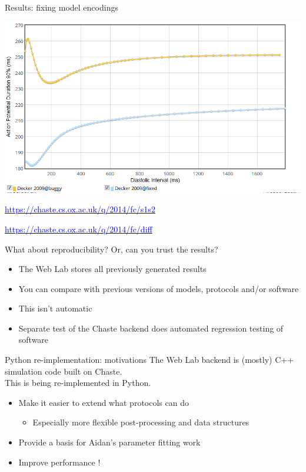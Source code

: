 \documentclass[t,xcolor={usenames,dvipsnames}]{beamer}
\newcommand{\myhref}[2]{\href{#1}{\textcolor{Blue}{#2}}}
\newcommand{\myurl}[1]{\myhref{#1}{#1}}
\newcommand{\subitem}[1]{\begin{itemize}[<.->]\item #1 \end{itemize}}
\begin{document}
\begin{frame}{Results: fixing model encodings}
\begin{center}
\includegraphics[width=\textwidth]{decker_comparison}

\tiny
\myurl{https://chaste.cs.ox.ac.uk/q/2014/fc/s1s2}

\myurl{https://chaste.cs.ox.ac.uk/q/2014/fc/diff}
\end{center}
\end{frame}


\begin{frame}{What about reproducibility?}
Or, can you trust the results?
\begin{itemize}
\item The Web Lab stores all previously generated results
\item You can compare with previous versions of models, protocols and/or software
\item This isn't automatic
\item Separate test of the Chaste backend does automated regression testing of software
\end{itemize}
\end{frame}


\begin{frame}{Python re-implementation: motivations}
The Web Lab backend is (mostly) C++ simulation code built on Chaste.\\
This is being re-implemented in Python.

\begin{itemize}[<2>]
\item Make it easier to extend what protocols can do
  \subitem{Especially more flexible post-processing and data structures}
\item Provide a basis for Aidan's parameter fitting work
\item Improve performance !
\end{itemize}
\end{frame}
\end{document}
